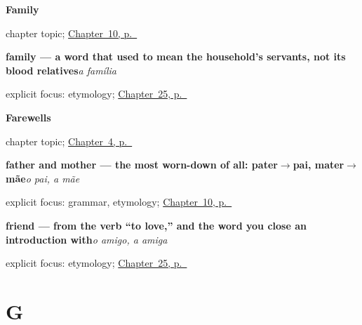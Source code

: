 \noindent\begin{minipage}[t]{\linewidth}
\raggedright
\textbf{Family}\par
\footnotesize chapter topic; \hyperref[ch:pt-family]{Chapter~10, p.~\pageref*{ch:pt-family}}
\end{minipage}\par\smallskip

\noindent\begin{minipage}[t]{\linewidth}
\raggedright
\textbf{family — a word that used to mean the household's servants, not its blood relatives}\enspace\emph{a família}\par
\footnotesize explicit focus: etymology; \hyperref[ch:pt-people-you-introduce]{Chapter~25, p.~\pageref*{ch:pt-people-you-introduce}}
\end{minipage}\par\smallskip

\noindent\begin{minipage}[t]{\linewidth}
\raggedright
\textbf{Farewells}\par
\footnotesize chapter topic; \hyperref[ch:pt-farewells]{Chapter~4, p.~\pageref*{ch:pt-farewells}}
\end{minipage}\par\smallskip

\noindent\begin{minipage}[t]{\linewidth}
\raggedright
\textbf{father and mother — the most worn-down of all: pater$\to$pai, mater$\to$mãe}\enspace\emph{o pai, a mãe}\par
\footnotesize explicit focus: grammar, etymology; \hyperref[ch:pt-family]{Chapter~10, p.~\pageref*{ch:pt-family}}
\end{minipage}\par\smallskip

\noindent\begin{minipage}[t]{\linewidth}
\raggedright
\textbf{friend — from the verb \textquotedblleft{}to love,\textquotedblright{} and the word you close an introduction with}\enspace\emph{o amigo, a amiga}\par
\footnotesize explicit focus: etymology; \hyperref[ch:pt-people-you-introduce]{Chapter~25, p.~\pageref*{ch:pt-people-you-introduce}}
\end{minipage}\par\smallskip

\section*{G}

